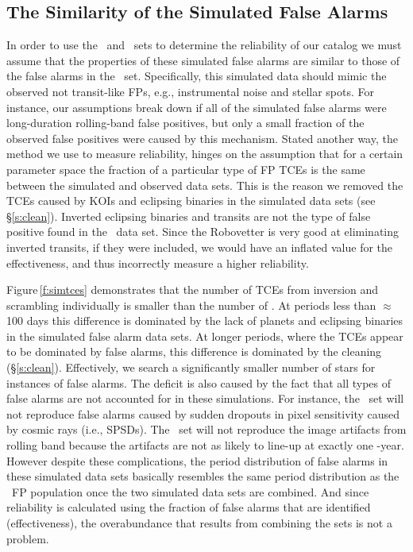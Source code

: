 \subsection{The Similarity of the Simulated False Alarms}
\label{s:simularity}
In order to use the \scrtce\ and \invtce\ sets to determine the reliability of our catalog we must assume that the properties of these simulated false alarms are similar to those of the false alarms in the \opstce\ set.  Specifically, this simulated data should mimic the observed not transit-like FPs, e.g., instrumental noise and stellar spots. For instance, our assumptions break down if all of the simulated false alarms were long-duration rolling-band false positives, but only a small fraction of the observed false positives were caused by this mechanism.  Stated another way, the method we use to measure reliability, hinges on the assumption that for a certain parameter space the fraction of a particular type of FP TCEs is the same between the simulated and observed data sets.  This is the reason we removed the TCEs caused by KOIs and eclipsing binaries in the simulated data sets (see \S\ref{s:clean}). Inverted eclipsing binaries and transits are not the type of false positive found in the \opstce\ data set.  Since the Robovetter is very good at eliminating inverted transits, if they were included, we would have an inflated value for the effectiveness, and thus incorrectly measure a higher reliability. 

Figure\,\ref{f:simtces} demonstrates that the number of TCEs from inversion and scrambling individually is smaller than the number of \opstces. At periods less than $\approx$100 days this difference is dominated by the lack of planets and eclipsing binaries in the simulated false alarm data sets.  At longer periods, where the TCEs appear to be dominated by false alarms, this difference is dominated by the cleaning (\S\ref{s:clean}). Effectively, we search a significantly smaller number of stars for instances of false alarms. The deficit is also caused by the fact that all types of false alarms are not accounted for in these simulations. For instance, the \invtce\ set will not reproduce false alarms caused by sudden dropouts in pixel sensitivity caused by cosmic rays (i.e., SPSDs). The \scrtce\ set will not reproduce the image artifacts from rolling band because the artifacts are not as likely to line-up at exactly one \Kepler -year.  However despite these complications, the period distribution of false alarms in these simulated data sets basically resembles the same period distribution as the \opstce\ FP population once the two simulated data sets are combined. And since reliability is calculated using the fraction of false alarms that are identified (effectiveness), the overabundance that results from combining the sets is not a problem.

